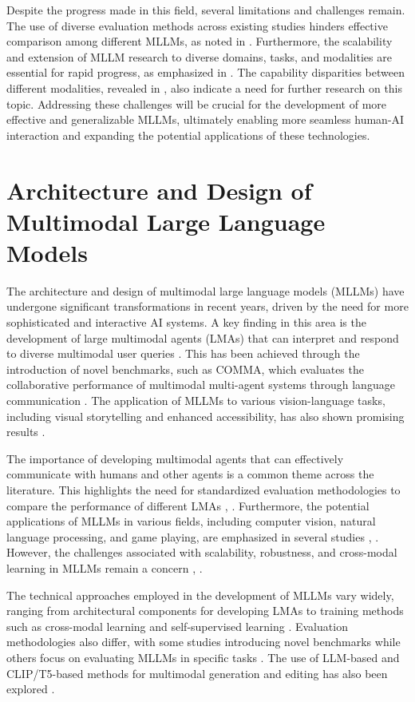 \documentclass[conference]{IEEEtran}
\begin{document}
Despite the progress made in this field, several limitations and challenges remain. The use of diverse evaluation methods across existing studies hinders effective comparison among different MLLMs, as noted in \cite{b5}. Furthermore, the scalability and extension of MLLM research to diverse domains, tasks, and modalities are essential for rapid progress, as emphasized in \cite{b4}. The capability disparities between different modalities, revealed in \cite{b3}, also indicate a need for further research on this topic. Addressing these challenges will be crucial for the development of more effective and generalizable MLLMs, ultimately enabling more seamless human-AI interaction and expanding the potential applications of these technologies.

\section{Architecture and Design of Multimodal Large Language Models}
The architecture and design of multimodal large language models (MLLMs) have undergone significant transformations in recent years, driven by the need for more sophisticated and interactive AI systems. A key finding in this area is the development of large multimodal agents (LMAs) that can interpret and respond to diverse multimodal user queries \cite{b1}. This has been achieved through the introduction of novel benchmarks, such as COMMA, which evaluates the collaborative performance of multimodal multi-agent systems through language communication \cite{b2}. The application of MLLMs to various vision-language tasks, including visual storytelling and enhanced accessibility, has also shown promising results \cite{b3}.

The importance of developing multimodal agents that can effectively communicate with humans and other agents is a common theme across the literature. This highlights the need for standardized evaluation methodologies to compare the performance of different LMAs \cite{b1}, \cite{b2}. Furthermore, the potential applications of MLLMs in various fields, including computer vision, natural language processing, and game playing, are emphasized in several studies \cite{b3}, \cite{b4}. However, the challenges associated with scalability, robustness, and cross-modal learning in MLLMs remain a concern \cite{b3}, \cite{b5}.

The technical approaches employed in the development of MLLMs vary widely, ranging from architectural components for developing LMAs \cite{b1} to training methods such as cross-modal learning and self-supervised learning \cite{b3}. Evaluation methodologies also differ, with some studies introducing novel benchmarks \cite{b2} while others focus on evaluating MLLMs in specific tasks \cite{b3}. The use of LLM-based and CLIP/T5-based methods for multimodal generation and editing has also been explored \cite{b6}.
\end{document}
